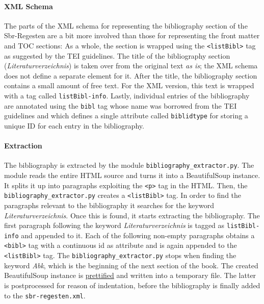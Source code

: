 \paragraph{XML Schema}

The parts of the XML schema for representing the bibliography section
of the Sbr-Regesten are a bit more involved than those for
representing the front matter and TOC sections: As a whole, the
section is wrapped using the \texttt{<listBibl>} tag as suggested by
the TEI guidelines. The title of the bibliography section
(\emph{Literaturverzeichnis}) is taken over from the original text
\emph{as is}; the XML schema does not define a separate element for
it. After the title, the bibliography section contains a small amount
of free text. For the XML version, this text is wrapped with a tag
called \texttt{listBibl-info}. Lastly, individual entries of the
bibliography are annotated using the \texttt{bibl} tag whose name was
borrowed from the TEI guidelines and which defines a single attribute
called \texttt{biblidtype} for storing a unique ID for each entry in
the bibliography.

\paragraph{Extraction}
The bibliography is extracted by the module \texttt{bibliography\_extractor.py}. The module reads the entire HTML source and turns it into a BeautifulSoup instance. It splits it up into paragraphs exploiting the \texttt{<p>} tag in the HTML. Then, the \texttt{bibliography\_extractor.py} creates a \texttt{<listBibl>} tag. In order to find the paragraphs relevant to the bibliography it searches for the keyword \emph{Literaturverzeichnis}. Once this is found, it starts extracting the bibliography. The first paragraph following the keyword \emph{Literaturverzeichnis} is tagged as \texttt{listBibl-info} and appended to it. Each of the following non-empty paragraphs obtains a \texttt{<bibl>} tag with a continuous id as attribute and is again appended to the \texttt{<listBibl>} tag. The \texttt{bibliography\_extractor.py} stops when finding the keyword \emph{Abk}, which is the beginning of the next section of the book. The created BeautifulSoup instance is \href{http://www.crummy.com/software/BeautifulSoup/bs4/doc/#pretty-printing}{prettified} and written into a temporary file. The latter is postprocessed for reason of indentation, before the bibliography is finally added to the \texttt{sbr-regesten.xml}.



